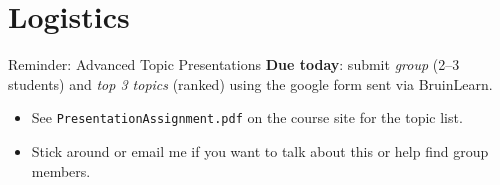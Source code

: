 \documentclass[xcolor=dvipsnames]{beamer}
\begin{document}
\section{Logistics}

\begin{frame}{Reminder: Advanced Topic Presentations}
\small
\textbf{Due today}: submit \textit{group} (2--3 students) and \textit{top 3 topics} (ranked) using the google form sent via BruinLearn.\\[6pt]

\begin{itemize}
\footnotesize
\item See \texttt{PresentationAssignment.pdf} on the course site for the topic list.
\item Stick around or email me if you want to talk about this or help find group members. 
\end{itemize}
\end{frame}
\end{document}
